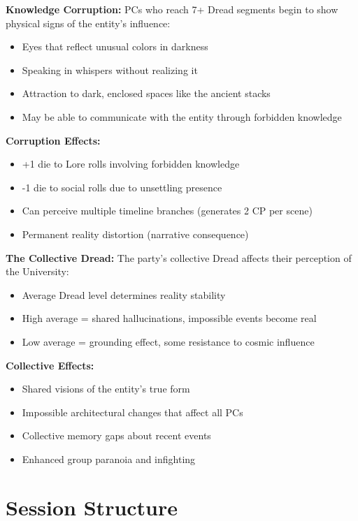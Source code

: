 \documentclass[11pt]{article}
\begin{document}
\textbf{Knowledge Corruption:}
PCs who reach 7+ Dread segments begin to show physical signs of the entity's influence:
\begin{itemize}
    \item Eyes that reflect unusual colors in darkness
    \item Speaking in whispers without realizing it
    \item Attraction to dark, enclosed spaces like the ancient stacks
    \item May be able to communicate with the entity through forbidden knowledge
\end{itemize}

\textbf{Corruption Effects:}
\begin{itemize}
    \item +1 die to Lore rolls involving forbidden knowledge
    \item -1 die to social rolls due to unsettling presence
    \item Can perceive multiple timeline branches (generates 2 CP per scene)
    \item Permanent reality distortion (narrative consequence)
\end{itemize}

\textbf{The Collective Dread:}
The party's collective Dread affects their perception of the University:
\begin{itemize}
    \item Average Dread level determines reality stability
    \item High average = shared hallucinations, impossible events become real
    \item Low average = grounding effect, some resistance to cosmic influence
\end{itemize}

\textbf{Collective Effects:}
\begin{itemize}
    \item Shared visions of the entity's true form
    \item Impossible architectural changes that affect all PCs
    \item Collective memory gaps about recent events
    \item Enhanced group paranoia and infighting
\end{itemize}

\section{Session Structure}
\end{document}
